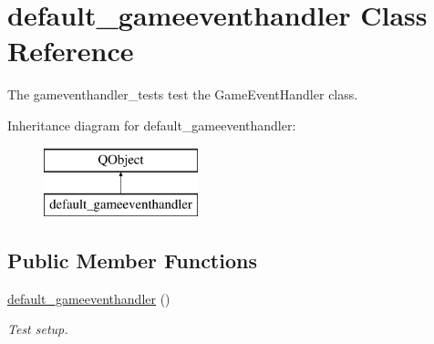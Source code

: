 \hypertarget{classdefault__gameeventhandler}{\section{default\-\_\-gameeventhandler Class Reference}
\label{classdefault__gameeventhandler}
}


The gameventhandler\-\_\-tests test the Game\-Event\-Handler class.  


Inheritance diagram for default\-\_\-gameeventhandler\-:\begin{figure}[H]
\begin{center}
\leavevmode
\includegraphics[height=2.000000cm]{classdefault__gameeventhandler}
\end{center}
\end{figure}
\subsection*{Public Member Functions}
\begin{DoxyCompactItemize}
\item 
\hyperlink{classdefault__gameeventhandler_a95b0dc5a9a792c26221332de6008ed1a}{default\-\_\-gameeventhandler} ()
\begin{DoxyCompactList}\small\item\em Test setup. \end{DoxyCompactList}\end{DoxyCompactItemize}
